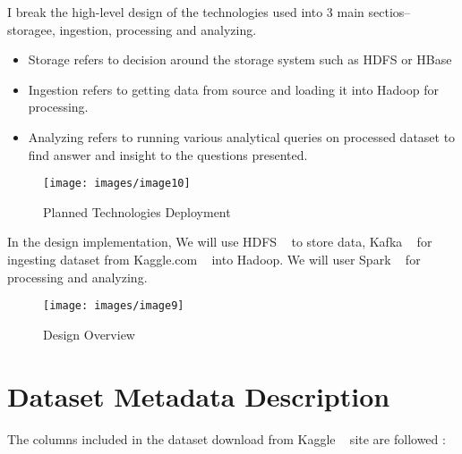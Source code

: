 \documentclass[9pt,twocolumn,twoside]{styles/osajnl}
\begin{document}
I break the high-level design of the technologies used into 3 main sectios-- storagee, ingestion, processing and analyzing. 

\begin{itemize}
  \item Storage refers to decision around the storage system such as HDFS or HBase
  \item Ingestion refers to getting data from source and loading it into Hadoop for processing.
  \item Analyzing refers to running various analytical queries on processed dataset to find answer and insight to the questions presented. 
\end{itemize}


\begin{figure}[H]
 \centering
\texttt{[image: images/image10]}
\caption{Planned Technologies Deployment ~\cite{wiki-ansible} ~\cite{www-kafka} ~\cite{www-spark} ~\cite{wiki-hadoop}}
\end{figure}


In the design implementation, We will use HDFS ~\cite{wiki-hadoop}
 to store data, Kafka  ~\cite{www-kafka} for ingesting dataset from Kaggle.com ~\cite{www-kaggle} into Hadoop.  We will user Spark  ~\cite{www-spark} for processing and analyzing. 

\begin{figure}[H]
 \centering
\texttt{[image: images/image9]}
\caption{Design Overview  ~\cite{www-kafka} ~\cite{www-spark} ~\cite{wiki-hadoop}}
\end{figure}


\section{Dataset Metadata Description}

The columns included in the dataset download from Kaggle ~\cite{www-kaggle} site  are followed  : 
\end{document}
